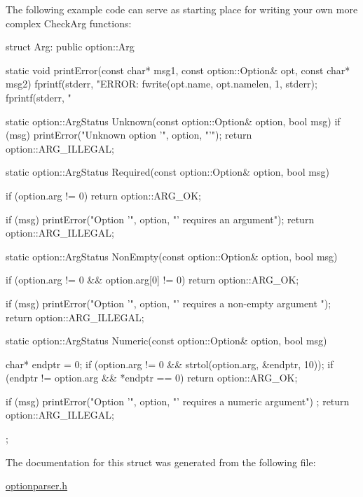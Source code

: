 \-The following example code can serve as starting place for writing your own more complex \-Check\-Arg functions\-: 
\begin{DoxyCode}
 struct Arg: public option::Arg
 {
   static void printError(const char* msg1, const option::Option& opt, const 
      char* msg2)
   {
     fprintf(stderr, "ERROR: %
     fwrite(opt.name, opt.namelen, 1, stderr);
     fprintf(stderr, "%
   }

   static option::ArgStatus Unknown(const option::Option& option, bool msg)
   {
     if (msg) printError("Unknown option '", option, "'\n");
     return option::ARG_ILLEGAL;
   }

   static option::ArgStatus Required(const option::Option& option, bool msg)
   {
     if (option.arg != 0)
       return option::ARG_OK;

     if (msg) printError("Option '", option, "' requires an argument\n");
     return option::ARG_ILLEGAL;
   }

   static option::ArgStatus NonEmpty(const option::Option& option, bool msg)
   {
     if (option.arg != 0 && option.arg[0] != 0)
       return option::ARG_OK;

     if (msg) printError("Option '", option, "' requires a non-empty argument\n
      ");
     return option::ARG_ILLEGAL;
   }

   static option::ArgStatus Numeric(const option::Option& option, bool msg)
   {
     char* endptr = 0;
     if (option.arg != 0 && strtol(option.arg, &endptr, 10)){};
     if (endptr != option.arg && *endptr == 0)
       return option::ARG_OK;

     if (msg) printError("Option '", option, "' requires a numeric argument\n")
      ;
     return option::ARG_ILLEGAL;
   }
 };
\end{DoxyCode}
 

\-The documentation for this struct was generated from the following file\-:\begin{DoxyCompactItemize}
\item 
\hyperlink{optionparser_8h}{optionparser.\-h}\end{DoxyCompactItemize}
